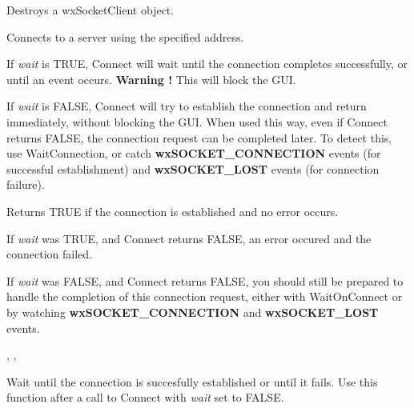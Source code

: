 Destroys a wxSocketClient object.

%
%
\label{wxsocketclientconnect}


Connects to a server using the specified address.

If {\it wait} is TRUE, Connect will wait until the connection completes
successfully, or until an event occurs. {\bf Warning !} This will block the GUI. 

If {\it wait} is FALSE, Connect will try to establish the connection and
return immediately, without blocking the GUI. When used this way, even if
Connect returns FALSE, the connection request can be completed later.
To detect this, use WaitConnection, or catch {\bf wxSOCKET\_CONNECTION}
events (for successful establishment) and {\bf wxSOCKET\_LOST} events
(for connection failure).





Returns TRUE if the connection is established and no error occurs.

If {\it wait} was TRUE, and Connect returns FALSE, an error occured
and the connection failed.

If {\it wait} was FALSE, and Connect returns FALSE, you should still
be prepared to handle the completion of this connection request, either
with WaitOnConnect or by watching {\bf wxSOCKET\_CONNECTION} and
{\bf wxSOCKET\_LOST} events.


, 
, 

%
%
\label{wxsocketclientwaitonconnect}


Wait until the connection is succesfully established or until it fails.
Use this function after a call to Connect with {\it wait} set to FALSE. 

